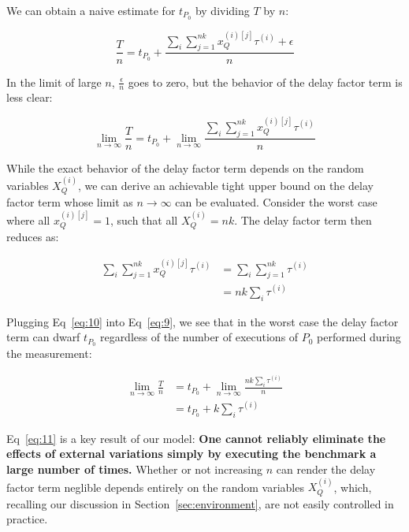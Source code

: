 \documentclass[conference]{IEEEtran}
\begin{document}
We can obtain a naive estimate for $t_{P_0}$ by dividing $T$ by $n$:

\begin{equation}
    \frac{T}{n} = t_{P_0} + \frac{\sum_{i} \sum_{j=1}^{nk} x_Q^{(i)[j]} \tau^{(i)} + \epsilon}{n}
\end{equation}

In the limit of large $n$, $\frac{\epsilon}{n}$ goes to zero, but the behavior of the delay
factor term is less clear:

\begin{equation}
    \lim_{n\to\infty} \frac{T}{n} = t_{P_0} + \lim_{n\to\infty} \frac{\sum_{i} \sum_{j=1}^{nk} x_Q^{(i)[j]} \tau^{(i)}}{n}
\end{equation}

While the exact behavior of the delay factor term depends on the random variables
$X_Q^{(i)}$, we can derive an achievable tight upper bound on the delay factor term whose
limit as $n \to \infty$ can be evaluated. Consider the worst case where all $x_Q^{(i)[j]} =
1$, such that all $X_Q^{(i)} = nk$. The delay factor term then reduces as:

\begin{align}
    \sum_{i} \sum_{j=1}^{nk} x_Q^{(i)[j]} \tau^{(i)} &= \sum_{i} \sum_{j=1}^{nk} \tau^{(i)} \\ \nonumber
                                                     &= nk \sum_{i} \tau^{(i)}
\end{align}

Plugging Eq~\ref{eq:10} into Eq~\ref{eq:9}, we see that in the worst case the delay factor
term can dwarf $t_{P_0}$ regardless of the number of executions of $P_0$ performed during
the measurement:

\begin{align}
    \lim_{n\to\infty} \frac{T}{n} &= t_{P_0} + \lim_{n\to\infty} \frac{nk \sum_{i} \tau^{(i)}}{n} \\ \nonumber
                                  &= t_{P_0} + k \sum_{i} \tau^{(i)}
\end{align}

Eq~\ref{eq:11} is a key result of our model: \textbf{One cannot reliably eliminate the
effects of external variations simply by executing the benchmark a large number of times.}
Whether or not increasing $n$ can render the delay factor term neglible depends entirely on
the random variables $X_Q^{(i)}$, which, recalling our discussion in
Section~\ref{sec:environment}, are not easily controlled in practice.
\end{document}
